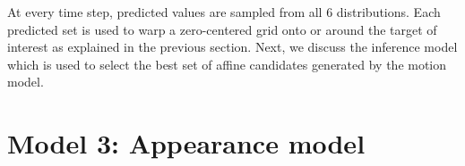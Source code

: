 At every time step, predicted values are sampled from all 6 distributions.  Each predicted set is used to warp a zero-centered grid onto or around the target of interest as explained in the previous section.  Next, we discuss the inference model which is used to select the best set of affine candidates generated by the motion model.

\section{Model 3: Appearance model}
\label{Sec:RVQ_trk_appearance_model}
								\begin{figure}[t]
								\hspace{0.55in}

\end{figure}
